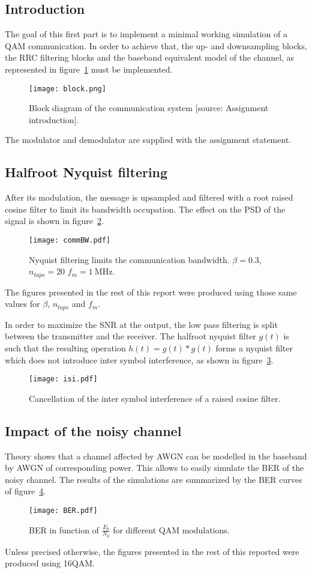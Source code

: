 \subsection{Introduction}
The goal of this first part is to implement a minimal working simulation of a QAM communication.
In order to achieve that, the up- and downsampling blocks, the RRC filtering blocks and the baseband equivalent model of the channel, as represented in figure~\ref{fig:chain} must be implemented.
\begin{figure}[htbp]
\centering
\texttt{[image: block.png]}
\caption{Block diagram of the communication system [source: Assignment introduction].\label{fig:chain}}
\end{figure}
The modulator and demodulator are supplied with the assignment statement.

\subsection{Halfroot Nyquist filtering}
After its modulation, the message is upsampled and filtered with a root raised cosine filter to limit its bandwidth occupation.
The effect on the PSD of the signal is shown in figure~\ref{fig:LPF}.
\begin{figure}[htbp]
\centering
\texttt{[image: commBW.pdf]}
\caption{Nyquist filtering limits the communication bandwidth. $\beta = 0.3$, $n_{taps} = 20$ $f_m = \SI{1}{\mega\hertz}.$ \label{fig:LPF}}
\end{figure}
The figures presented in the rest of this report were produced using those same values for $\beta$, $n_{taps}$ and $f_m$.

In order to maximize the SNR at the output, the low pass filtering is split between the transmitter and the receiver.
The halfroot nyquist filter $g(t)$ is such that the resulting operation $h(t) = g(t)*g(t)$ forms a nyquist filter which does not introduce inter symbol interference, as shown in figure~\ref{fig:noISI}.
\begin{figure}
\centering
\texttt{[image: isi.pdf]}
\caption{Cancellation of the inter symbol interference of a raised cosine filter.\label{fig:noISI}}
\end{figure}

\subsection{Impact of the noisy channel}
Theory shows that a channel affected by AWGN can be modelled in the baseband by AWGN of corresponding power.
This allows to easily simulate the BER of the noisy channel.
The results of the simulations are summarized by the BER curves of figure~\ref{fig:BER}.
\begin{figure}[htbp]
\texttt{[image: BER.pdf]}
\caption{BER in function of $\frac{E_b}{N_0}$ for different QAM modulations.\label{fig:BER}}
\end{figure}
Unless precised otherwise, the figures presented in the rest of this reported were produced using 16QAM.

